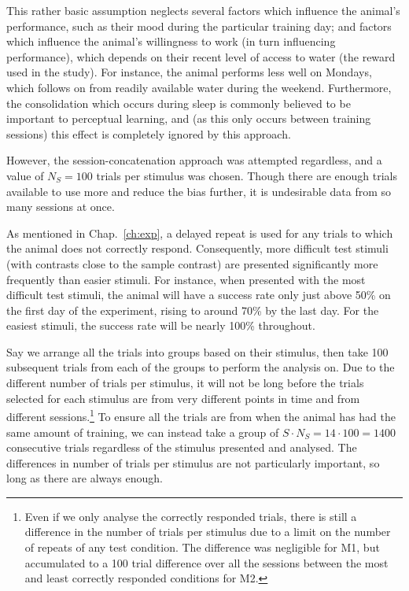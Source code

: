 This rather basic assumption neglects several factors which influence the animal's performance, such as their mood during the particular training day; and factors which influence the animal's willingness to work (in turn influencing performance), which depends on their recent level of access to water (the reward used in the study). For instance, the animal performs less well on Mondays, which follows on from readily available water during the weekend.
Furthermore, the consolidation which occurs during sleep is commonly believed to be important to perceptual learning, and (as this only occurs between training sessions) this effect is completely ignored by this approach.

However, the session-concatenation approach was attempted regardless, and a value of $N_S = 100$ trials per stimulus was chosen. Though there are enough trials available to use more and reduce the bias further, it is undesirable data from so many sessions at once.

As mentioned in Chap.~\ref{ch:exp}, a delayed repeat is used for any trials to which the animal does not correctly respond. Consequently, more difficult test stimuli (with contrasts close to the sample contrast) are presented significantly more frequently than easier stimuli.
For instance, when presented with the most difficult test stimuli, the animal will have a success rate only just above 50\% on the first day of the experiment, rising to around 70\% by the last day. For the easiest stimuli, the success rate will be nearly 100\% throughout.

Say we arrange all the trials into groups based on their stimulus, then take 100 subsequent trials from each of the groups to perform the analysis on. Due to the different number of trials per stimulus, it will not be long before the trials selected for each stimulus are from very different points in time and from different sessions.\footnote{Even if we only analyse the correctly responded trials, there is still a difference in the number of trials per stimulus due to a limit on the number of repeats of any test condition. The difference was negligible for \ac{M1}, but accumulated to a 100 trial difference over all the sessions between the most and least correctly responded conditions for \ac{M2}.}
To ensure all the trials are from when the animal has had the same amount of training, we can instead take a group of $S \cdot N_S = 14 \cdot 100 = 1400$ consecutive trials regardless of the stimulus presented and analysed. The differences in number of trials per stimulus are not particularly important, so long as there are always  enough.

